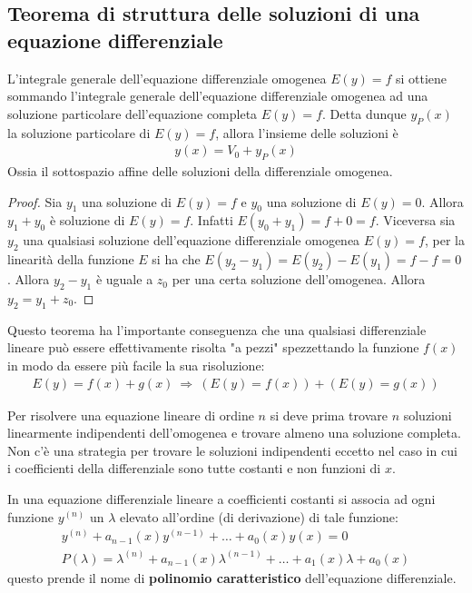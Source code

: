 \documentclass[a4paper, oneside]{book}
\begin{document}
\clearpage
\subsection{Teorema di struttura delle soluzioni di una equazione differenziale}
\begin{theorem}
    L'integrale generale dell'equazione differenziale omogenea $E(y) = f$ si ottiene
    sommando l'integrale generale dell'equazione differenziale omogenea ad una
    soluzione particolare dell'equazione completa $E(y) = f$. Detta dunque
    $y_P(x)$ la soluzione particolare di $E(y) = f$, allora l'insieme delle soluzioni è
    \begin{align}
        y(x) = V_0 + y_P(x)
    \end{align}
    Ossia il sottospazio affine delle soluzioni della differenziale omogenea.
\end{theorem}
\begin{proof}
    Sia $y_1$ una soluzione di $E(y) = f$ e $y_0$ una soluzione di
    $E(y) = 0$. Allora $y_1 + y_0$ è soluzione di $E(y) = f$. Infatti $E(y_0 + y_1) = f + 0 = f$.
    Viceversa sia $y_2$ una qualsiasi soluzione dell'equazione differenziale
    omogenea $E(y) = f$, per la linearità della funzione $E$ si ha che
    $E(y_2 - y_1) = E(y_2) - E(y_1) = f - f = 0$. Allora $y_2 - y_1$ è uguale 
    a $z_0$ per una certa soluzione dell'omogenea. Allora $y_2 = y_1 + z_0$. 
\end{proof}
\begin{corollary}
    Questo teorema ha l'importante conseguenza che una qualsiasi differenziale lineare
    può essere effettivamente risolta "a pezzi" spezzettando la funzione $f(x)$ in modo 
    da essere più facile la sua risoluzione:
    \begin{gather*}
        E(y) = f(x)  + g(x) \ \Longrightarrow \ (E(y) = f(x))  + (E(y) = g(x)) 
    \end{gather*}
\end{corollary} \noindent 
Per risolvere una equazione lineare di ordine $n$ si deve prima trovare $n$ soluzioni
linearmente indipendenti dell'omogenea e trovare almeno una soluzione completa. Non c'è una strategia
per trovare le soluzioni indipendenti eccetto nel caso in cui
i coefficienti della differenziale sono tutte costanti e non funzioni di $x$. 

\begin{definition}
    In una equazione differenziale lineare a coefficienti costanti 
    si associa ad ogni funzione $y^{(n)}$ un $\lambda$ elevato all'ordine (di derivazione) di
    tale funzione:
    \begin{gather*}
        y^{(n)} + a_{n - 1}(x)y^{(n - 1)}+ \dots + a_0(x)y(x) = 0 \\
       P(\lambda) = \lambda^{(n)} + a_{n -1}(x)\lambda^{(n - 1)} +\dots + a_1(x)\lambda + a_0(x)  
    \end{gather*} 
    questo prende il nome di \textbf{polinomio caratteristico} dell'equazione differenziale.
\end{definition}
\end{document}
